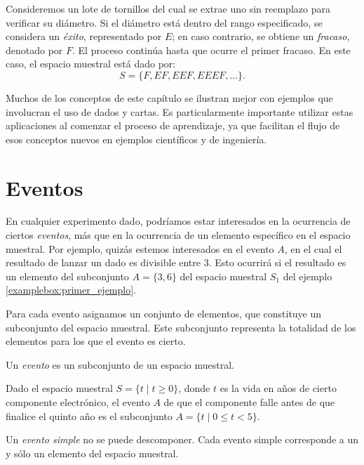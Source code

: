 \newpage

\begin{examplebox}{}{}
    Consideremos un lote de tornillos del cual se extrae uno sin reemplazo para verificar su diámetro. Si el diámetro está dentro del rango especificado, se considera un \emph{éxito}, representado por $E$; en caso contrario, se obtiene un \emph{fracaso}, denotado por $F$. El proceso continúa hasta que ocurre el primer fracaso. En este caso, el espacio muestral está dado por:
    $$S = \{ F, EF, EEF, EEEF, \dots \}.$$
\end{examplebox}

Muchos de los conceptos de este capítulo se ilustran mejor con ejemplos que involucran el uso de dados y cartas. Es particularmente importante utilizar estas aplicaciones al comenzar el proceso de aprendizaje, ya que facilitan el flujo de esos conceptos nuevos en ejemplos científicos y de ingeniería.

\section{Eventos}

En cualquier experimento dado, podríamos estar interesados en la ocurrencia de ciertos \emph{eventos}, más que en la ocurrencia de un elemento específico en el espacio muestral. Por ejemplo, quizás estemos interesados en el evento $A$, en el cual el resultado de lanzar un dado es divisible entre 3. Esto ocurrirá si el resultado es un elemento del subconjunto $A = \{3, 6\}$ del espacio muestral $S_1$ del ejemplo \ref{examplebox:primer_ejemplo}.

Para cada evento asignamos un conjunto de elementos, que constituye un
subconjunto del espacio muestral. Este subconjunto representa la totalidad de los elementos para los que el evento es cierto.

\begin{definicion}{}{}
    Un \emph{evento} es un subconjunto de un espacio muestral.
\end{definicion}

\begin{examplebox}{}{}
    Dado el espacio muestral $S = \{t \mid t \geq 0\}$, donde $t$ es la vida en años de cierto componente electrónico, el evento $A$ de que el componente falle antes de que finalice el quinto año es el subconjunto $A = \{t \mid 0 \leq t < 5\}$.
\end{examplebox}

\begin{definicion}{}{}
    Un \emph{evento simple} no se puede descomponer. Cada evento simple corresponde a un y sólo un elemento del espacio muestral.
\end{definicion}
